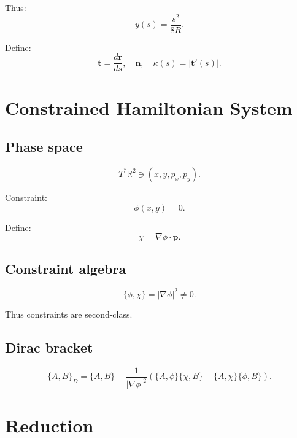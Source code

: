 \documentclass[11pt]{article}
\begin{document}
Thus:
\begin{equation}
y(s) = \frac{s^2}{8R}.
\end{equation}

Define:
\begin{equation}
\mathbf{t} = \frac{d\mathbf{r}}{ds}, \quad
\mathbf{n}, \quad
\kappa(s) = |\mathbf{t}'(s)|.
\end{equation}

\section{Constrained Hamiltonian System}

\subsection{Phase space}

\begin{equation}
T^*\mathbb{R}^2 \ni (x,y,p_x,p_y).
\end{equation}

Constraint:
\begin{equation}
\phi(x,y)=0.
\end{equation}

Define:
\begin{equation}
\chi = \nabla\phi \cdot \mathbf{p}.
\end{equation}

\subsection{Constraint algebra}

\begin{equation}
\{\phi,\chi\} = |\nabla\phi|^2 \neq 0.
\end{equation}

Thus constraints are second-class.

\subsection{Dirac bracket}

\begin{equation}
\{A,B\}_D =
\{A,B\}
- \frac{1}{|\nabla\phi|^2}
(\{A,\phi\}\{\chi,B\} - \{A,\chi\}\{\phi,B\}).
\end{equation}

\section{Reduction}
\end{document}
